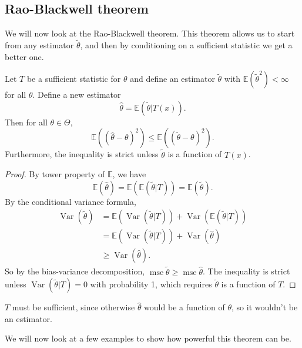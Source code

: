 \documentclass[egregdoesnotlikesansseriftitles,a4paper]{scrartcl}
\begin{document}
\subsection{Rao-Blackwell theorem}
We will now look at the Rao-Blackwell theorem. This theorem allows us to start from any estimator $\widetilde{\theta}$, and then by conditioning on a sufficient statistic we get a better one.
\begin{theorem}
      Let $T$ be a sufficient statistic for $\theta$ and define an estimator $\widetilde{\theta}$ with $\mathbb{E}(\widetilde{\theta}^2)< \infty$ for all $\theta$. Define a new estimator \[
      \hat{\theta}=\mathbb{E} (\widetilde{\theta} \left|T (x)\right.)
      .\] Then for all $\theta \in \Theta$, \[
      \mathbb{E}((\hat{\theta}-\theta)^2) \leq \mathbb{E} ((\widetilde{\theta}-\theta)^2)
      .\] Furthermore, the inequality is strict unless $\widetilde{\theta}$ is a function of $T (x)$.
\end{theorem}
\begin{proof}
      By tower property of $\mathbb{E}$, we have \[
      \mathbb{E}(\hat{\theta})=\mathbb{E}(\mathbb{E}(\widetilde{\theta}|T))=\mathbb{E}(\widetilde{\theta})
      .\] By the conditional variance formula, 
      \begin{align*}
          \operatorname{Var}(\widetilde{\theta})&=\mathbb{E}(\operatorname{Var}(\widetilde{\theta}|T))+\operatorname{Var}(\mathbb{E}(\widetilde{\theta}|T))\\
          &=\mathbb{E}(\operatorname{Var}(\widetilde{\theta}|T))+\operatorname{Var}(\hat{\theta})\\
          &\geq \operatorname{Var}(\hat{\theta}).
      \end{align*}
      So by the bias-variance decomposition, $\operatorname{mse} \widetilde{\theta}\geq \operatorname{mse}\hat{\theta}$. The inequality is strict unless $\operatorname{Var}(\widetilde{\theta}|T)=0$ with probability 1, which requires $\widetilde{\theta}$ is a function of $T$.
\end{proof}
\begin{remark}
      $T$ must be sufficient, since otherwise $\hat{\theta}$ would be a function of $\theta$, so it wouldn't be an estimator.
\end{remark}
We will now look at a few examples to show how powerful this theorem can be.
\end{document}
